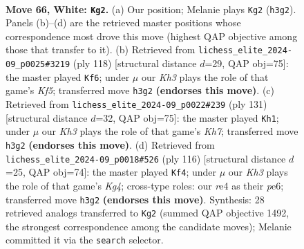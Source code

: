 \documentclass[11pt]{article}
\begin{document}
\clearpage

\begin{figure}[p]\centering
\begin{subfigure}{0.46\textwidth}\centering
\resizebox{\linewidth}{!}{%
\newchessgame
\chessboard[
  setfen={2Q5/8/5pkq/3p4/4r3/6PK/7P/8 w - - 12 66},
  showmover=false,
  pgfstyle=straightmove, color=movearrow, markmove={h3-g2}
]}
\caption{}
\end{subfigure}\hfill
\begin{subfigure}{0.46\textwidth}\centering
\resizebox{\linewidth}{!}{%
\newchessgame
\chessboard[
  setfen={8/5Q2/6P1/5K2/1p3P2/k7/2q5/8 w - - 4 60},
  showmover=false,
  pgfstyle=straightmove, color=movearrow, markmove={f5-f6}
]}
\caption{}
\end{subfigure}
\\[4pt]
\begin{subfigure}{0.46\textwidth}\centering
\resizebox{\linewidth}{!}{%
\newchessgame
\chessboard[
  setfen={6R1/8/8/3KQ3/8/7p/7k/5q2 b - - 12 66},
  showmover=false,
  pgfstyle=straightmove, color=movearrow, markmove={h2-h1}
]}
\caption{}
\end{subfigure}\hfill
\begin{subfigure}{0.46\textwidth}\centering
\resizebox{\linewidth}{!}{%
\newchessgame
\chessboard[
  setfen={1Q6/5k2/4p3/4P2P/6K1/6P1/8/3q4 w - - 10 59},
  showmover=false,
  pgfstyle=straightmove, color=movearrow, markmove={g4-f4}
]}
\caption{}
\end{subfigure}
\caption{\textbf{Move 66, White: \texttt{Kg2}.} (a) Our position; Melanie plays \texttt{Kg2} (\texttt{h3g2}). Panels (b)--(d) are the retrieved master positions whose correspondence most drove this move (highest QAP objective among those that transfer to it). (b) Retrieved from \texttt{lichess\_elite\_2024-09\_p0025\#3219} (ply 118) [structural distance $d$=29, QAP obj=75]: the master played \texttt{Kf6}; under $\mu$ our \emph{Kh3} plays the role of that game's \emph{Kf5}; transferred move \texttt{h3g2} \textbf{(endorses this move)}. (c) Retrieved from \texttt{lichess\_elite\_2024-09\_p0022\#239} (ply 131) [structural distance $d$=32, QAP obj=75]: the master played \texttt{Kh1}; under $\mu$ our \emph{Kh3} plays the role of that game's \emph{Kh7}; transferred move \texttt{h3g2} \textbf{(endorses this move)}. (d) Retrieved from \texttt{lichess\_elite\_2024-09\_p0018\#526} (ply 116) [structural distance $d$=25, QAP obj=74]: the master played \texttt{Kf4}; under $\mu$ our \emph{Kh3} plays the role of that game's \emph{Kg4}; cross-type roles: our \emph{r}e4 as their \emph{p}e6; transferred move \texttt{h3g2} \textbf{(endorses this move)}. Synthesis: 28 retrieved analogs transferred to \texttt{Kg2} (summed QAP objective 1492, the strongest correspondence among the candidate moves); Melanie committed it via the \texttt{search} selector.}
\label{fig:thought-m130}
\end{figure}
\end{document}
